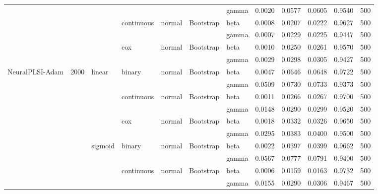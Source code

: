 \begin{tabular}{lllllllrrrrr}
 &  &  &  &  &  & gamma & 0.0020 & 0.0577 & 0.0605 & 0.9540 & 500 \\
\cline{4-12} \cline{5-12} \cline{6-12}
 &  &  & \multirow[t]{2}{*}{continuous} & \multirow[t]{2}{*}{normal} & \multirow[t]{2}{*}{Bootstrap} & beta & 0.0008 & 0.0207 & 0.0222 & 0.9627 & 500 \\
 &  &  &  &  &  & gamma & 0.0007 & 0.0229 & 0.0225 & 0.9447 & 500 \\
\cline{4-12} \cline{5-12} \cline{6-12}
 &  &  & \multirow[t]{2}{*}{cox} & \multirow[t]{2}{*}{normal} & \multirow[t]{2}{*}{Bootstrap} & beta & 0.0010 & 0.0250 & 0.0261 & 0.9570 & 500 \\
 &  &  &  &  &  & gamma & 0.0029 & 0.0298 & 0.0305 & 0.9427 & 500 \\
\cline{1-12} \cline{2-12} \cline{3-12} \cline{4-12} \cline{5-12} \cline{6-12}
\multirow[t]{18}{*}{NeuralPLSI-Adam} & \multirow[t]{18}{*}{2000} & \multirow[t]{6}{*}{linear} & \multirow[t]{2}{*}{binary} & \multirow[t]{2}{*}{normal} & \multirow[t]{2}{*}{Bootstrap} & beta & 0.0047 & 0.0646 & 0.0648 & 0.9722 & 500 \\
 &  &  &  &  &  & gamma & 0.0509 & 0.0730 & 0.0733 & 0.9373 & 500 \\
\cline{4-12} \cline{5-12} \cline{6-12}
 &  &  & \multirow[t]{2}{*}{continuous} & \multirow[t]{2}{*}{normal} & \multirow[t]{2}{*}{Bootstrap} & beta & 0.0011 & 0.0266 & 0.0267 & 0.9700 & 500 \\
 &  &  &  &  &  & gamma & 0.0148 & 0.0290 & 0.0299 & 0.9520 & 500 \\
\cline{4-12} \cline{5-12} \cline{6-12}
 &  &  & \multirow[t]{2}{*}{cox} & \multirow[t]{2}{*}{normal} & \multirow[t]{2}{*}{Bootstrap} & beta & 0.0018 & 0.0332 & 0.0326 & 0.9650 & 500 \\
 &  &  &  &  &  & gamma & 0.0295 & 0.0383 & 0.0400 & 0.9500 & 500 \\
\cline{3-12} \cline{4-12} \cline{5-12} \cline{6-12}
 &  & \multirow[t]{6}{*}{sigmoid} & \multirow[t]{2}{*}{binary} & \multirow[t]{2}{*}{normal} & \multirow[t]{2}{*}{Bootstrap} & beta & 0.0022 & 0.0397 & 0.0399 & 0.9662 & 500 \\
 &  &  &  &  &  & gamma & 0.0567 & 0.0777 & 0.0791 & 0.9400 & 500 \\
\cline{4-12} \cline{5-12} \cline{6-12}
 &  &  & \multirow[t]{2}{*}{continuous} & \multirow[t]{2}{*}{normal} & \multirow[t]{2}{*}{Bootstrap} & beta & 0.0006 & 0.0159 & 0.0163 & 0.9732 & 500 \\
 &  &  &  &  &  & gamma & 0.0155 & 0.0290 & 0.0306 & 0.9467 & 500 \\

\end{tabular}

